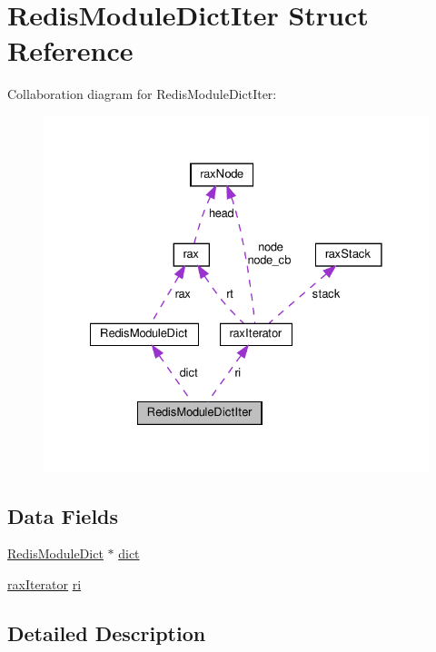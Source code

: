 \hypertarget{struct_redis_module_dict_iter}{}\section{Redis\+Module\+Dict\+Iter Struct Reference}
\label{struct_redis_module_dict_iter}


Collaboration diagram for Redis\+Module\+Dict\+Iter\+:
\nopagebreak
\begin{figure}[H]
\begin{center}
\leavevmode
\includegraphics[width=328pt]{struct_redis_module_dict_iter__coll__graph}
\end{center}
\end{figure}
\subsection*{Data Fields}
\begin{DoxyCompactItemize}
\item 
\hyperlink{struct_redis_module_dict}{Redis\+Module\+Dict} $\ast$ \hyperlink{struct_redis_module_dict_iter_a893664b6557501272c352ca1fce43d84}{dict}
\item 
\hyperlink{structrax_iterator}{rax\+Iterator} \hyperlink{struct_redis_module_dict_iter_abe7bb9f1992cb1fb3c1ecb28c13772a4}{ri}
\end{DoxyCompactItemize}


\subsection{Detailed Description}


